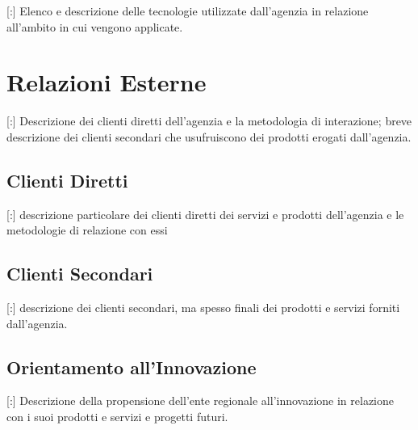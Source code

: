 [:] Elenco e descrizione delle tecnologie utilizzate dall'agenzia in relazione all'ambito in cui vengono applicate.

\section{Relazioni Esterne}

[:] Descrizione dei clienti diretti dell'agenzia e la metodologia di interazione; breve descrizione dei clienti secondari che usufruiscono dei prodotti erogati dall'agenzia.

\subsection{Clienti Diretti}

[:]  descrizione particolare dei clienti diretti dei servizi e prodotti dell'agenzia e le metodologie di relazione con essi

\subsection{Clienti Secondari}

[:] descrizione dei clienti secondari, ma spesso finali dei prodotti e servizi forniti dall'agenzia.

\subsection{Orientamento all'Innovazione}

[:] Descrizione della propensione dell'ente regionale all'innovazione in relazione con i suoi prodotti e servizi e progetti futuri.

